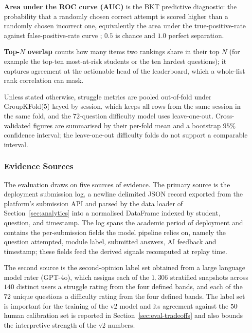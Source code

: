 \textbf{Area under the ROC curve (AUC)} is the BKT predictive diagnostic: the probability that a randomly chosen correct attempt is scored higher than a randomly chosen incorrect one, equivalently the area under the true-positive-rate against false-positive-rate curve \cite{fawcettIntroductionROCAnalysis2006,hanleyMeaningUseArea1982}; $0.5$ is chance and $1.0$ perfect separation.

\textbf{Top-$N$ overlap} counts how many items two rankings share in their top $N$ (for example the top-ten most-at-risk students or the ten hardest questions); it captures agreement at the actionable head of the leaderboard, which a whole-list rank correlation can mask.

Unless stated otherwise, struggle metrics are pooled out-of-fold under GroupKFold($5$) keyed by session, which keeps all rows from the same session in the same fold, and the $72$-question difficulty model uses leave-one-out. Cross-validated figures are summarised by their per-fold mean and a bootstrap $95\%$ confidence interval; the leave-one-out difficulty folds do not support a comparable interval.

\subsubsection{Evidence Sources}

The evaluation draws on five sources of evidence. 
The primary source is the deployment submission log, a newline delimited JSON record exported from the platform's submission API and parsed by the data loader of Section~\ref{sec:analytics} into a normalised DataFrame indexed by student, question, and timestamp. 
The log spans the academic period of deployment and contains the per-submission fields the model pipeline relies on, namely the question attempted, module label, submitted answers, AI feedback and timestamp; these fields feed the derived signals recomputed at replay time.

The second source is the second-opinion label set obtained from a large language model rater (GPT-4o), which assigns each of the $1{,}306$ stratified snapshots across $140$ distinct users a struggle rating from the four defined bands, and each of the $72$ unique questions a difficulty rating from the four defined bands.
The label set is important for the training of the v2 model and its agreement against the $50$ human calibration set is reported in Section~\ref{sec:eval-tradeoffs} and also bounds the interpretive strength of the v2 numbers.


